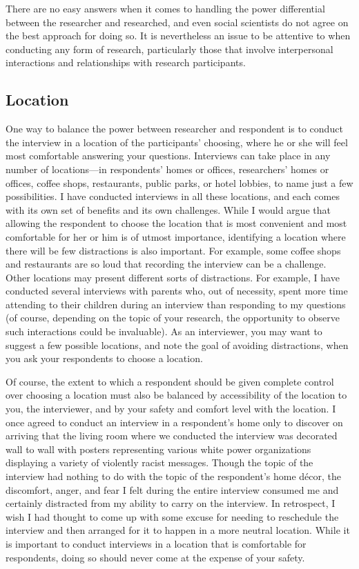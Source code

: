 There are no easy answers when it comes to handling the power differential between the researcher and researched, and even social scientists do not agree on the best approach for doing so. It is nevertheless an issue to be attentive to when conducting any form of research, particularly those that involve interpersonal interactions and relationships with research participants.

\subsection{Location}

One way to balance the power between researcher and respondent is to conduct the interview in a location of the participants’ choosing, where he or she will feel most comfortable answering your questions. Interviews can take place in any number of locations—in respondents’ homes or offices, researchers’ homes or offices, coffee shops, restaurants, public parks, or hotel lobbies, to name just a few possibilities. I have conducted interviews in all these locations, and each comes with its own set of benefits and its own challenges. While I would argue that allowing the respondent to choose the location that is most convenient and most comfortable for her or him is of utmost importance, identifying a location where there will be few distractions is also important. For example, some coffee shops and restaurants are so loud that recording the interview can be a challenge. Other locations may present different sorts of distractions. For example, I have conducted several interviews with parents who, out of necessity, spent more time attending to their children during an interview than responding to my questions (of course, depending on the topic of your research, the opportunity to observe such interactions could be invaluable). As an interviewer, you may want to suggest a few possible locations, and note the goal of avoiding distractions, when you ask your respondents to choose a location.

Of course, the extent to which a respondent should be given complete control over choosing a location must also be balanced by accessibility of the location to you, the interviewer, and by your safety and comfort level with the location. I once agreed to conduct an interview in a respondent’s home only to discover on arriving that the living room where we conducted the interview was decorated wall to wall with posters representing various white power organizations displaying a variety of violently racist messages. Though the topic of the interview had nothing to do with the topic of the respondent’s home décor, the discomfort, anger, and fear I felt during the entire interview consumed me and certainly distracted from my ability to carry on the interview. In retrospect, I wish I had thought to come up with some excuse for needing to reschedule the interview and then arranged for it to happen in a more neutral location. While it is important to conduct interviews in a location that is comfortable for respondents, doing so should never come at the expense of your safety.

